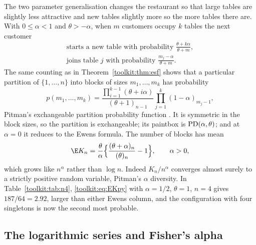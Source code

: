 The two parameter generalisation changes the restaurant so that large tables are slightly less
attractive and new tables slightly more so the more tables there are. With $0\le\alpha<1$ and
$\theta>-\alpha$, when $m$ customers occupy $k$ tables the next customer
\begin{equation}\label{toolkit:eq:pycrp}
\begin{gathered}
\text{starts a new table with probability }\frac{\theta+k\alpha}{\theta+m},\\
\text{joins table }j\text{ with probability }\frac{m_j-\alpha}{\theta+m}.
\end{gathered}
\end{equation}
The same counting as in Theorem~\ref{toolkit:thm:esf} shows that a particular partition of
$\{1,\dots,n\}$ into blocks of sizes $m_1,\dots,m_k$ has probability
\begin{equation}\label{toolkit:eq:eppf}
p(m_1,\dots,m_k)=\frac{\prod_{i=1}^{k-1}(\theta+i\alpha)}{(\theta+1)_{n-1}}\prod_{j=1}^k(1-\alpha)_{m_j-1},
\end{equation}
Pitman's exchangeable partition probability function \citep{toolkit:pitman1995,toolkit:pitman2006}.
It is symmetric in the block sizes, so the partition is exchangeable; its paintbox is
$\mathrm{PD}(\alpha,\theta)$; and at $\alpha=0$ it reduces to the Ewens formula. The number of blocks has
mean
\begin{equation}\label{toolkit:eq:EKpy}
\E K_n=\frac{\theta}{\alpha}\Big\{\frac{(\theta+\alpha)_n}{(\theta)_n}-1\Big\},\qquad \alpha>0,
\end{equation}
which grows like $n^\alpha$ rather than $\log n$. Indeed $K_n/n^\alpha$ converges almost surely to a
strictly positive random variable, Pitman's $\alpha$ diversity. In Table~\ref{toolkit:tab:n4},
\eqref{toolkit:eq:EKpy} with $\alpha=1/2$, $\theta=1$, $n=4$ gives $187/64=2.92$, larger than
either Ewens column, and the configuration with four singletons is now the second most probable.

\subsection{The logarithmic series and Fisher's alpha}\label{toolkit:sec:logseries}

